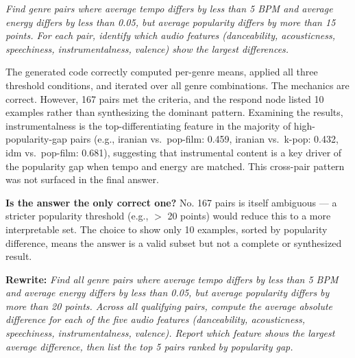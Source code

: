 \documentclass[12pt, oneside]{report}
\begin{document}

\textit{Find genre pairs where average tempo differs by less than 5 BPM and average energy differs by less than 0.05, but average popularity differs by more than 15 points. For each pair, identify which audio features (danceability, acousticness, speechiness, instrumentalness, valence) show the largest differences.}

The generated code correctly computed per-genre means, applied all three threshold conditions, and iterated over all genre combinations. The mechanics are correct. However, 167 pairs met the criteria, and the respond node listed 10 examples rather than synthesizing the dominant pattern. Examining the results, instrumentalness is the top-differentiating feature in the majority of high-popularity-gap pairs (e.g., iranian vs.\ pop-film: 0.459, iranian vs.\ k-pop: 0.432, idm vs.\ pop-film: 0.681), suggesting that instrumental content is a key driver of the popularity gap when tempo and energy are matched. This cross-pair pattern was not surfaced in the final answer.

\textbf{Is the answer the only correct one?} No. 167 pairs is itself ambiguous --- a stricter popularity threshold (e.g., $>$ 20 points) would reduce this to a more interpretable set. The choice to show only 10 examples, sorted by popularity difference, means the answer is a valid subset but not a complete or synthesized result.

\textbf{Rewrite:} \textit{Find all genre pairs where average tempo differs by less than 5 BPM and average energy differs by less than 0.05, but average popularity differs by more than 20 points. Across all qualifying pairs, compute the average absolute difference for each of the five audio features (danceability, acousticness, speechiness, instrumentalness, valence). Report which feature shows the largest average difference, then list the top 5 pairs ranked by popularity gap.}
\end{document}

